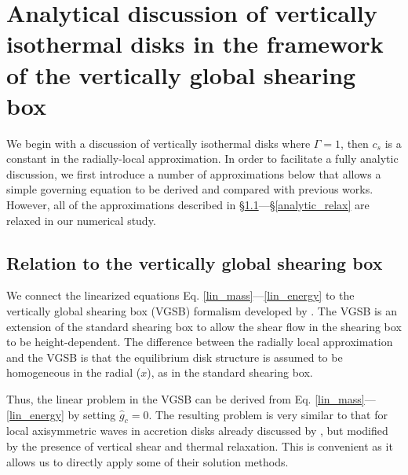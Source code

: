 \section{Analytical discussion of vertically isothermal
  disks in the framework of the vertically global shearing
  box}\label{analytical}  
We begin with a discussion of vertically isothermal disks
where $\Gamma=1$, then $c_s$ is a constant in the radially-local
approximation. %
In order to facilitate a fully analytic discussion, we first introduce a
number of approximations below that allows a simple governing equation
to be derived and compared with previous works.  However, all of the 
approximations described in
\S\ref{vgsb_approx}---\S\ref{analytic_relax} are relaxed in our
numerical study.    

\subsection{Relation to the vertically global
  shearing box}\label{vgsb_approx} 
We connect the linearized equations 
Eq. \ref{lin_mass}---\ref{lin_energy} to the vertically global  
shearing box (VGSB) formalism developed by \cite{mcnally14}. The VGSB
is an extension of the standard shearing box \citep{goldreich65} to
allow the shear flow in the shearing box to be height-dependent. 
The difference between the radially local
approximation and the VGSB is that the equilibrium disk
structure is assumed to be homogeneous in the radial ($x$), as in the
standard shearing box.  

Thus, the linear problem in the VGSB can be derived from
Eq. \ref{lin_mass}---\ref{lin_energy} by setting 
$\hat{g}_c=0$. The resulting problem is very similar 
to that for local axisymmetric waves in accretion disks already
discussed by \cite{lubow93}, but modified by the presence of vertical
shear and thermal relaxation. This is convenient as it allows us to
directly apply some of their solution methods.    

